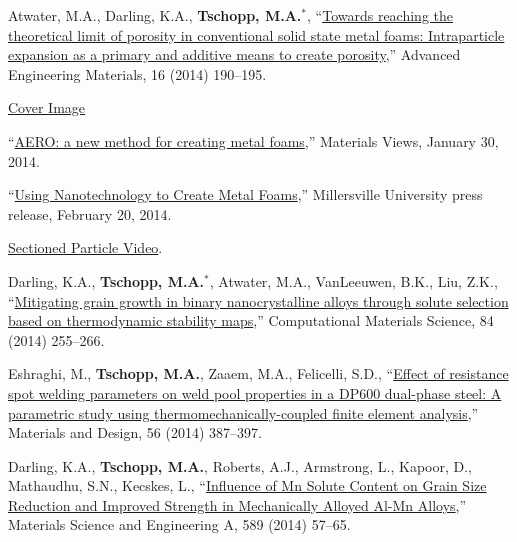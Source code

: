 \begin{cvlist}
\item
Atwater, M.A., Darling, K.A., \textbf{Tschopp, M.A.}$^\ast$, ``\href{http://dx.doi.org/10.1002/adem.201300431}{Towards reaching the theoretical limit of porosity in conventional solid state metal foams: Intraparticle expansion as a primary and additive means to create porosity},'' Advanced Engineering Materials, 16 (2014) 190--195.
\begin{list2}
\item[$\star$] \href{http://onlinelibrary.wiley.com/doi/10.1002/adem.201470006/pdf}{Cover Image}
\item[$\star$] ``\href{http://www.materialsviews.com/aero-a-new-method-for-creating-metal-foams/}{AERO: a new method for creating metal foams},'' Materials Views, January 30, 2014.
\item[$\star$] ``\href{http://blogs.millersville.edu/exchange/2014/02/20/using-nanotechnology-to-create-metal-foams/}{Using Nanotechnology to Create Metal Foams},'' Millersville University press release, February 20, 2014.
\item[$\star$] \href{http://onlinelibrary.wiley.com/store/10.1002/adem.201300431/asset/supinfo/adem201300431-sm-0001-SuppFig-S1.gif?v=1&s=2410042c646030030c12bb1c065d433cecdad07d}{Sectioned Particle Video}.
\end{list2}

\item
Darling, K.A., \textbf{Tschopp, M.A.}$^\ast$, Atwater, M.A., VanLeeuwen, B.K., Liu, Z.K., ``\href{http://dx.doi.org/10.1016/j.commatsci.2013.10.018}{Mitigating grain growth in binary nanocrystalline alloys through solute selection based on thermodynamic stability maps},'' Computational Materials Science, 84 (2014) 255--266.

\item
{Eshraghi, M.}, \textbf{Tschopp, M.A.}, Zaaem, M.A., Felicelli, S.D., ``\href{http://dx.doi.org/10.1016/j.matdes.2013.11.026}{Effect of resistance spot welding parameters on weld pool properties in a DP600 dual-phase steel: A parametric study using thermomechanically-coupled finite element analysis},'' Materials and Design, 56 (2014) 387--397.

\item
Darling, K.A., \textbf{Tschopp, M.A.}, Roberts, A.J., Armstrong, L., Kapoor, D., Mathaudhu, S.N., Kecskes, L., ``\href{http://dx.doi.org/10.1016/j.msea.2013.09.047}{Influence of Mn Solute Content on Grain Size Reduction and Improved Strength in Mechanically Alloyed Al-Mn Alloys},'' Materials Science and Engineering A, 589 (2014) 57--65.


\end{cvlist}
